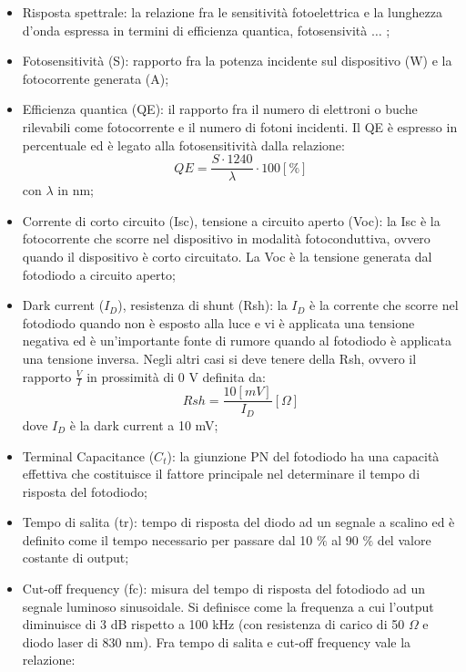 \documentclass[journal, a4paper]{IEEEtran}
\begin{document}
\begin{itemize}
\item Risposta spettrale: la relazione fra le sensitività fotoelettrica e la lunghezza d'onda espressa in termini di efficienza quantica, fotosensività $\dots$ ;
\item Fotosensitività (S): rapporto fra la potenza incidente sul dispositivo (W) e la fotocorrente generata (A);
\item Efficienza quantica (QE): il rapporto fra il numero di elettroni o buche rilevabili come fotocorrente e il numero di fotoni incidenti. Il QE è espresso in percentuale ed è legato alla fotosensitività dalla relazione:
\begin{equation}
QE = \frac{S \cdot 1240}{\lambda} \cdot 100 [\%]
\end{equation}
con $\lambda$ in nm;
\item Corrente di corto circuito (Isc), tensione a circuito aperto (Voc): la Isc è la fotocorrente che scorre nel dispositivo in modalità fotoconduttiva, ovvero quando il dispositivo è corto circuitato. La Voc è la tensione generata dal fotodiodo a circuito aperto;
\item Dark current ($I_D$), resistenza di shunt (Rsh): la $I_D$ è la corrente che scorre nel fotodiodo quando non è esposto alla luce e vi è applicata una tensione negativa ed è un'importante fonte di rumore quando al fotodiodo è applicata una tensione inversa. Negli altri casi si deve tenere della Rsh, ovvero il rapporto $\frac{V}{I}$ in prossimità di 0 V definita da:
\begin{equation}
Rsh = \frac{10[mV]}{I_D} [\Omega]
\end{equation}
dove $I_D$ è la dark current a 10 mV;
\item Terminal Capacitance ($C_t$): la giunzione PN del fotodiodo ha una capacità effettiva che costituisce il fattore principale nel determinare il tempo di risposta del fotodiodo;
\item Tempo di salita (tr): tempo di risposta del diodo ad un segnale a scalino ed è definito come il tempo necessario per passare dal 10 $\%$ al 90 $\%$ del valore costante di output;
\item Cut-off frequency (fc): misura del tempo di risposta del fotodiodo ad un segnale luminoso sinusoidale. Si definisce come la frequenza a cui l'output diminuisce di 3 dB rispetto a 100 kHz (con resistenza di carico di 50 $\Omega$ e diodo laser di 830 nm). Fra tempo di salita e cut-off frequency vale la relazione:
\begin{equation}

\end{equation}
\end{itemize}
\end{document}
